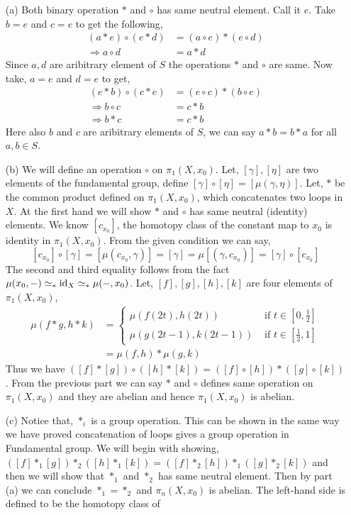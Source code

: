 \documentclass[11pt]{article}
\begin{document}
 \begin{itemize}
    \item[(a)] Both binary operation $\ast$ and $\circ$ has same neutral element. Call it $e$. Take $b = e$ and $c=e$ to get the following, 
    \begin{align*}
        (a \ast e) \circ (e \ast d) &= (a \circ e) \ast (e \circ d) \\
        \Rightarrow a \circ d &= a \ast d
    \end{align*}
    Since $a,d$ are aribitrary element of $S$ the operations $\ast$ and $\circ$ are same. Now take, $a = e$ and $d =e$ to get,
    \begin{align*}
        (e \ast b) \circ (c \ast e) &= (e \circ c) \ast (b \circ e) \\
        \Rightarrow b \circ c &= c \ast b\\
        \Rightarrow b\ast c &= c \ast b
    \end{align*}
    Here also $b$ and $c$ are aribitrary elements of $S$, we can say $a \ast b = b \ast a$ for all $a,b \in S$.
    \item[(b)] We will define an operation $\circ$ on $\pi_1(X,x_0)$. Let, $[\gamma], [\eta]$ are two elements of the fundamental group, define $[\gamma] \circ [\eta] = [\mu(\gamma,\eta)]$. Let, $\ast$ be the common product defined on $\pi_1 (X,x_0)$, which concatenates two loops in $X$. At the first hand we will show $\ast$ and $\circ$ has same neutral (identity) elements. We know $[c_{x_0}]$, the homotopy class of the constant map to $x_0$ is identity in $\pi_1(X,x_0)$. From the given condition we can say, $$[c_{x_0}]\circ [\gamma]=[\mu(c_{x_0}, \gamma)] = [\gamma] = \mu[(\gamma,c_{x_0})]=[\gamma]\circ [c_{x_0}]$$
    The second and third equality follows from the fact $\mu(x_0, -) \simeq_* \mathrm{id}_X \simeq_* \mu(-,x_0)$. Let, $[f],[g],[h],[k]$ are four elements of $\pi_1(X,x_0)$, 
    \begin{align*}
       \mu (f\ast g, h\ast k) &= \begin{cases}
        \mu(f(2t),h(2t)) & \text{ if } t\in [0,\frac{1}{2}] \\
        \mu (g(2t-1),k(2t-1)) & \text{ if } t \in [\frac{1}{2},1]
       \end{cases} \\
       &= \mu(f,h) \ast \mu(g,k)
    \end{align*}
    Thus we have $([f]\ast[g])\circ([h]\ast [k]) = ([f]\circ [h])\ast ([g]\circ [k])$. From the previous part we can say $\ast$ and $\circ$ defines same operation on $\pi_1(X,x_0)$ and they are abelian and hence $\pi_1(X,x_0)$ is abelian. 
    \item[(c)] Notice that, $\ast_i$ is a group operation. This can be shown in the same way we have proved concatenation of loops gives a group operation in Fundamental group. We will begin with showing, $([f] \ast_1 [g])\ast_2([h] \ast_1 [k])=([f]\ast_2[h]) \ast_1 ([g]\ast_2[k])$ and then we will show that $\ast_1$ and $\ast_2$ has same neutral element. Then by part (a) we can conclude $\ast_1 = \ast_2$ and $\pi_n(X,x_0)$ is abelian. The left-hand side is defined to be the homotopy class of


\end{itemize}
\end{document}
